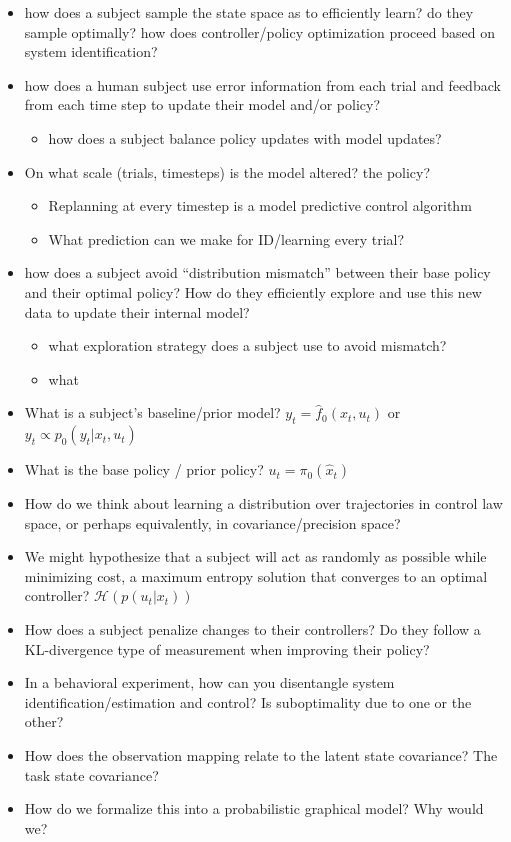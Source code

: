\documentclass[
  a4paper,
]{article}
\providecommand{\tightlist}{%
  \setlength{\itemsep}{0pt}\setlength{\parskip}{0pt}}
\begin{document}
\begin{itemize}
\item
  how does a subject sample the state space as to efficiently learn? do
  they sample optimally? how does controller/policy optimization proceed
  based on system identification?
\item
  how does a human subject use error information from each trial and
  feedback from each time step to update their model and/or policy?

  \begin{itemize}
  \tightlist
  \item
    how does a subject balance policy updates with model updates?
  \end{itemize}
\item
  On what scale (trials, timesteps) is the model altered? the policy?

  \begin{itemize}
  \tightlist
  \item
    Replanning at every timestep is a model predictive control algorithm
  \item
    What prediction can we make for ID/learning every trial?
  \end{itemize}
\item
  how does a subject avoid ``distribution mismatch'' between their base
  policy and their optimal policy? How do they efficiently explore and
  use this new data to update their internal model?

  \begin{itemize}
  \tightlist
  \item
    what exploration strategy does a subject use to avoid mismatch?
  \item
    what
  \end{itemize}
\item
  What is a subject's baseline/prior model?
  \(y_{t} = \hat{f}_0(x_t,u_t)\) or \(y_{t} \propto p_0(y_t|x_{t},u_t)\)
\item
  What is the base policy / prior policy? \(u_t = \pi_0(\hat{x}_t)\)
\item
  How do we think about learning a distribution over trajectories in
  control law space, or perhaps equivalently, in covariance/precision
  space?
\item
  We might hypothesize that a subject will act as randomly as possible
  while minimizing cost, a maximum entropy solution that converges to an
  optimal controller? \(\mathcal{H}(p(u_t|x_t))\)
\item
  How does a subject penalize changes to their controllers? Do they
  follow a KL-divergence type of measurement when improving their
  policy?
\item
  In a behavioral experiment, how can you disentangle system
  identification/estimation and control? Is suboptimality due to one or
  the other?
\item
  How does the observation mapping relate to the latent state
  covariance? The task state covariance?
\item
  How do we formalize this into a probabilistic graphical model? Why
  would we?


\end{itemize}
\end{document}

